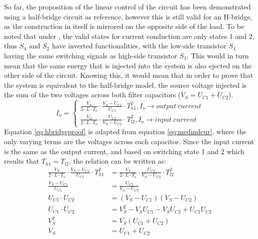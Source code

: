 So far, the proposition of the linear control of the circuit has been demonstrated using a half-bridge circuit as reference, however this is still valid for an \gls{H-bridge}, as the construction in itself is mirrored on the opposite side of the load.
To be noted that under , the valid states for current conduction are only states 1 and 2, thus $S_4$ and $S_2$ have inverted functionalities, with the low-side transistor $S_4$ having the same switching signals as high-side transistor $S_1$.
This would in turn mean that the same energy that is injected into the system is also ejected on the other side of the circuit.
Knowing this, it would mean that in order to prove that the system is equivalent to the half-bridge model, the source voltage injected is the sum of the two voltages across both filter capacitors ($V_S = U_{C1} + U_{C2}$).
\begin{equation}
    \label{eq:hbridgeproof}
    I_o =  \left\{
        \begin{aligned}
            \frac{V_S}{2 \cdot L \cdot T_o} \cdot \frac{V_S - U_{C1}}{U_{C1}} \cdot T_{h1}^2, I_o \rightarrow output \ current\\
            \frac{V_S}{2 \cdot L \cdot T_o} \cdot \frac{U_{C2}}{V_S - U_{C2}} \cdot T_{l2}^2, I_o \rightarrow input \ current 
        \end{aligned}
    \right.
\end{equation}
Equation \eqref{eq:hbridgeproof} is adapted from equation \eqref{eq:medindcur}, where the only varying terms are the voltages across each capacitor.
Since the input current is the same as the output current, and based on switching state 1 and 2 which results that $T_{h1} = T_{l2}$, the relation can be written as:
\begin{equation}
    \begin{split}
        \frac{V_S}{2 \cdot L \cdot T_o} \cdot \frac{V_S - U_{C1}}{U_{C1}} \cdot T_{h1}^2 &= \frac{V_S}{2 \cdot L \cdot T_o} \cdot \frac{U_{C2}}{V_S - U_{C2}} \cdot T_{l2}^2 \\
        \frac{V_S - U_{C1}}{U_{C1}} &= \frac{U_{C2}}{V_S - U_{C2}} \\
        U_{C1} \cdot U_{C2} &= (V_S - U_{C1})(V_S - U_{C2}) \\
        U_{C1} \cdot U_{C2} &= V_S^2 - V_S U_{C1} - V_S U_{C2} + U_{C1} U_{C2} \\
        V_S^2 &= V_S(U_{C1} + U_{C2}) \\
        V_S &= U_{C1} + U_{C2}
    \end{split}
\end{equation}

